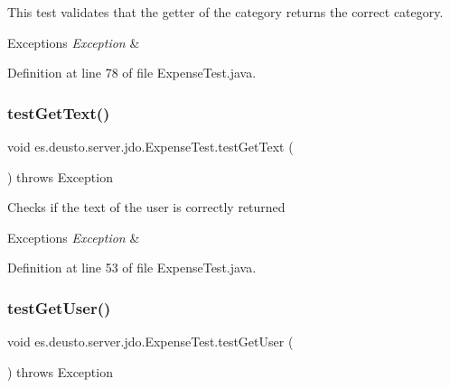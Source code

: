 This test validates that the getter of the category returns the correct category. 
\begin{DoxyExceptions}{Exceptions}
{\em Exception} & \\
\hline
\end{DoxyExceptions}


Definition at line 78 of file Expense\+Test.\+java.

\mbox{\label{classes_1_1deusto_1_1server_1_1jdo_1_1_expense_test_a07a19f73b071030eea8864b86e394794}} 
\subsubsection{\texorpdfstring{test\+Get\+Text()}{testGetText()}}
{\footnotesize\ttfamily void es.\+deusto.\+server.\+jdo.\+Expense\+Test.\+test\+Get\+Text (\begin{DoxyParamCaption}{ }\end{DoxyParamCaption}) throws Exception}

Checks if the text of the user is correctly returned


\begin{DoxyExceptions}{Exceptions}
{\em Exception} & \\
\hline
\end{DoxyExceptions}


Definition at line 53 of file Expense\+Test.\+java.

\mbox{\label{classes_1_1deusto_1_1server_1_1jdo_1_1_expense_test_a2b21c0ad0d040cfed79bb52c9123e3d0}} 
\subsubsection{\texorpdfstring{test\+Get\+User()}{testGetUser()}}
{\footnotesize\ttfamily void es.\+deusto.\+server.\+jdo.\+Expense\+Test.\+test\+Get\+User (\begin{DoxyParamCaption}{ }\end{DoxyParamCaption}) throws Exception}

